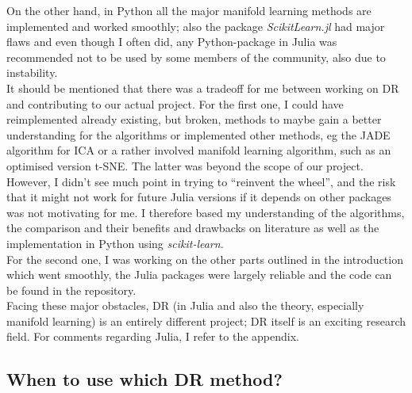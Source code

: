 \documentclass[journal, a4paper]{IEEEtran}
\begin{document}
On the other hand, in Python all the major manifold learning methods are implemented and worked smoothly; also the package \textit{ScikitLearn.jl} had major flaws and even though I often did, any Python-package in Julia was recommended not to be used by some members of the community, also due to instability. \\

It should be mentioned that there was a tradeoff for me between working on DR and contributing to our actual project. 
For the first one, I could have reimplemented already existing, but broken, methods to maybe gain a better understanding for the algorithms or implemented other methods, eg the JADE algorithm for ICA or a rather involved manifold learning algorithm, such as an optimised version t-SNE. The latter was beyond the scope of our project. However, I didn’t see much point in trying to “reinvent the wheel”, and the risk that it might not work for future Julia versions if it depends on other packages was not motivating for me. %
I therefore based my understanding of the algorithms, the comparison and their benefits and drawbacks on literature as well as the implementation in Python using \textit{scikit-learn}.\\
For the second one, I was working on the other parts outlined in the introduction which went smoothly, the Julia packages were largely reliable and the code can be found in the repository. \\

Facing these major obstacles, DR (in Julia and also the theory, especially manifold learning) is an entirely different project; DR itself is an exciting research field. For comments regarding Julia, I refer to the appendix. 


\subsection{When to use which DR method?}
\end{document}
